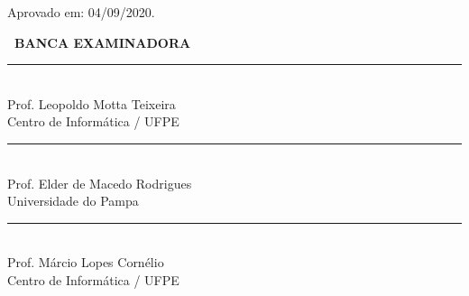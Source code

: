 
\thispagestyle{empty}
\begin{center}

    {\bfseries\ABNTEXchapterfont\fontsize{12}{12}\selectfont\imprimirautor}
	
    \vspace{1.0cm}
    \begin{center}
      \ABNTEXchapterfont\fontsize{12}{12}\selectfont\imprimirtitulo
    \end{center}
    \vspace{1cm}
	

      \hspace{.30\textwidth}
      \begin{minipage}{.55\textwidth}
      	\SingleSpacing
         \imprimirpreambuloatadefesa
       \end{minipage}%
       
    \vspace{0.5cm}
    \begin{flushleft}
    {\fontsize{12}{12}\selectfont Aprovado em: 04/09/2020.}
    \vspace{0.5cm}
    \end{flushleft}

     \vspace{1cm}
     
    {\bfseries\fontsize{12}{12}\selectfont\ BANCA EXAMINADORA}
    
    \vspace{1cm}
    
        
		{\SingleSpacing
		\par\noindent\rule{0.6\textwidth}{0.4pt}\\
		Prof. Leopoldo Motta Teixeira\\
		Centro de Informática / UFPE}
		
        \vspace{0.2cm}
        {\SingleSpacing
		\par\noindent\rule{0.6\textwidth}{0.4pt}\\
		Prof. Elder de Macedo Rodrigues\\
		Universidade do Pampa} 
		
        \vspace{0.2cm}
        {\SingleSpacing
		\par\noindent\rule{0.6\textwidth}{0.4pt}\\
		Prof. Márcio Lopes Cornélio\\
		Centro de Informática / UFPE}
		

		
	
  \end{center}
  
